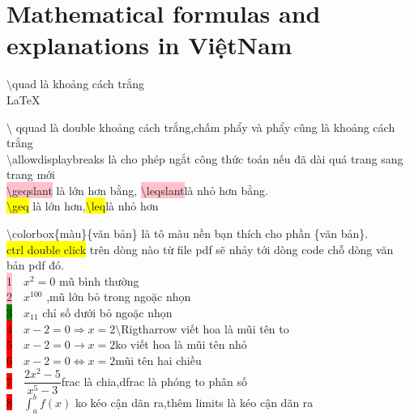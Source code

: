 \documentclass{article}
\begin{document}
\Large\section{Mathematical formulas and explanations in ViệtNam}
\large $\setminus$quad là khoảng cách trắng\\

\LaTeX\

$\setminus$ qquad là double khoảng cách trắng,chấm phẩy và phẩy cũng là khoảng cách trắng\\

$\setminus$allowdisplaybreaks là cho phép ngắt công thức toán nếu đã dài quá trang sang trang mới\\

\colorbox{pink}{$\setminus$geqslant} là lớn hơn bằng, \colorbox{pink}{$\setminus$leqslant}là nhỏ hơn bằng.\\

\colorbox{yellow}{$\setminus$geq} là lớn hơn,\colorbox{yellow}{$\setminus$leq}là nhỏ hơn

$\setminus$colorbox\{màu\}\{văn bản\} là tô màu nền bạn thích cho phần \{văn bản\}.\\

\colorbox{yellow}{ctrl double click} trên dòng nào từ file pdf sẽ nhảy tới dòng code chỗ dòng văn bản pdf đó.\\

\colorbox{pink}{1}$\quad x^2=0$  \quad     mũ bình thường \\

\colorbox{pink}{2}$\quad x^{100}$ \quad ,mũ lớn bỏ trong ngoặc nhọn\\

\colorbox{green}{3}$\quad x_{11}$ \quad chỉ số dưới bỏ ngoặc nhọn\\

\colorbox{red}{4}$\quad  x-2=0 \Rightarrow x=2 $\quad  $\setminus$Rigtharrow viết hoa là mũi tên to\\

\colorbox{red}{5}$\quad x-2=0 \rightarrow x=2  $\quad  ko viết hoa là mũi tên nhỏ\\

\colorbox{red}{6}$\quad x-2=0 \Leftrightarrow x=2 $\quad mũi tên hai chiều\\

\colorbox{red}{7}$\quad\dfrac{2x^2-5}{x^5-3}$\quad frac là chia,dfrac là phóng to phân số\\

\colorbox{red}{8}$\quad \displaystyle\int_a^bf(x)$ \quad ko kéo cận dãn ra,thêm limits là kéo cận dãn ra\\
\end{document}
